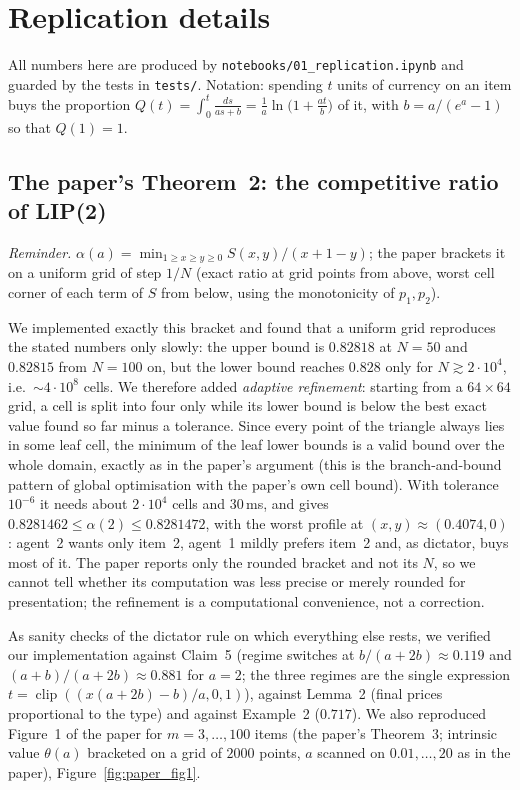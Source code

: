 \section{Replication details}
\label{app:repl}

All numbers here are produced by \texttt{notebooks/01\_replication.ipynb} and guarded by the
tests in \texttt{tests/}. Notation: spending $t$ units of currency on an item buys the proportion
$Q(t)=\int_0^t\frac{ds}{as+b}=\frac1a\ln\!\big(1+\tfrac{at}{b}\big)$ of it, with $b=a/(e^a-1)$ so that $Q(1)=1$.

\subsection{The paper's Theorem~2: the competitive ratio of LIP(2)}

\emph{Reminder.} $\alpha(a)=\min_{1\ge x\ge y\ge0}S(x,y)/(x+1-y)$; the paper brackets it on a
uniform grid of step $1/N$ (exact ratio at grid points from above, worst cell corner of each term
of $S$ from below, using the monotonicity of $p_1,p_2$).

We implemented exactly this bracket and found that a uniform grid reproduces the stated numbers
only slowly: the upper bound is $0.82818$ at $N=50$ and $0.82815$ from $N=100$ on, but the lower
bound reaches $0.828$ only for $N\gtrsim2\cdot10^4$, i.e.\ $\sim4\cdot10^8$ cells. We therefore
added \emph{adaptive refinement}: starting from a $64\times64$ grid, a cell is split into four
only while its lower bound is below the best exact value found so far minus a tolerance. Since
every point of the triangle always lies in some leaf cell, the minimum of the leaf lower bounds
is a valid bound over the whole domain, exactly as in the paper's argument (this is the
branch-and-bound pattern of global optimisation with the paper's own cell bound). With tolerance
$10^{-6}$ it needs about $2\cdot10^4$ cells and 30\,ms, and gives
$0.8281462\le\alpha(2)\le0.8281472$, with the worst profile at $(x,y)\approx(0.4074,0)$: agent~2
wants only item~2, agent~1 mildly prefers item~2 and, as dictator, buys most of it. The paper
reports only the rounded bracket and not its $N$, so we cannot tell whether its computation was
less precise or merely rounded for presentation; the refinement is a computational convenience,
not a correction.

As sanity checks of the dictator rule on which everything else rests, we verified our
implementation against Claim~5 (regime switches at $b/(a+2b)\approx0.119$ and
$(a+b)/(a+2b)\approx0.881$ for $a=2$; the three regimes are the single expression
$t=\operatorname{clip}((x(a+2b)-b)/a,0,1)$), against Lemma~2 (final prices proportional to the
type) and against Example~2 ($0.717$). We also reproduced Figure~1 of the paper for
$m=3,\ldots,100$ items (the paper's Theorem~3; intrinsic value $\theta(a)$ bracketed on a grid of $2000$
points, $a$ scanned on $0.01,\ldots,20$ as in the paper), Figure~\ref{fig:paper_fig1}.

